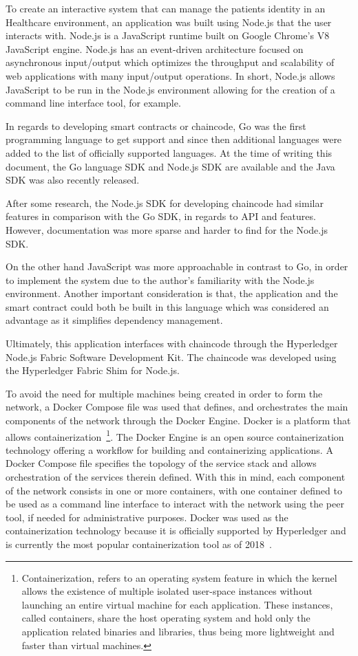 To create an interactive system that can manage the patients identity in an
Healthcare environment, an application was built using Node.js that the user
interacts with. Node.js is a JavaScript runtime built on Google Chrome's V8
JavaScript engine. Node.js has an event-driven architecture focused on
asynchronous input/output which optimizes the throughput and scalability of web
applications with many input/output operations. In short, Node.js allows
JavaScript to be run in the Node.js environment allowing for the creation of a
command line interface tool, for example.

In regards to developing smart contracts or chaincode, Go was the first
programming language to get support and since then additional languages were
added to the list of officially supported languages. At the time of writing
this document, the Go language SDK and Node.js SDK are available and the Java
SDK was also recently released. 

After some research, the Node.js SDK for developing chaincode had similar
features in comparison with the Go SDK, in regards to API and features.
However, documentation was more sparse and harder to find for the Node.js SDK. 

On the other hand JavaScript was more approachable in contrast to Go, in order
to implement the system due to the author's familiarity with the Node.js
environment. Another important consideration is that, the application and the
smart contract could both be built in this language which was considered an
advantage as it simplifies dependency management. 

Ultimately, this application interfaces with chaincode through the Hyperledger
Node.js Fabric Software Development Kit. The chaincode was developed using the
Hyperledger Fabric Shim for Node.js.

To avoid the need for multiple machines being created in order to form the
network, a Docker Compose file was used that defines, and orchestrates the main
components of the network through the Docker Engine. Docker is a platform that
allows containerization~\footnote{Containerization, refers to an operating
system feature in which the kernel allows the existence of multiple isolated
user-space instances without launching an entire virtual machine for each
application. These instances, called containers, share the host operating
system and hold only the application related binaries and libraries, thus being
more lightweight and faster than virtual machines.}. The Docker Engine is an
open source containerization technology offering a workflow for building and
containerizing applications. A Docker Compose file specifies the topology of
the service stack and allows orchestration of the services therein defined.
With this in mind, each component of the network consists in one or more
containers, with one container defined to be used as a command line interface
to interact with the network using the peer tool, if needed for administrative
purposes. Docker was used as the containerization technology because it is
officially supported by Hyperledger and is currently the most popular
containerization tool as of
2018~\cite{dockerAdoption2018,containerAdoption2018}.


